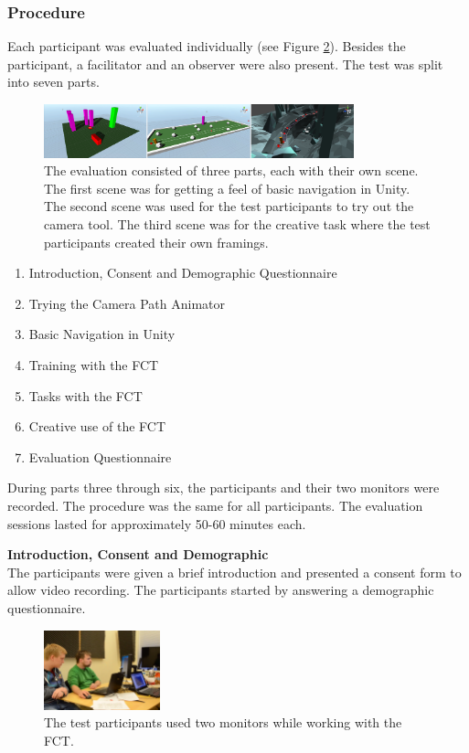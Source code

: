 \subsubsection{Procedure}
Each participant was evaluated individually (see Figure \ref{fig:tt}). Besides the participant, a facilitator and an observer were also present. The test was split into seven parts. 
\begin{figure}[hbtp]
\centering
\includegraphics[width=0.8\textwidth]{Pics/sceneAll_horizontal}
\caption{The evaluation consisted of three parts, each with their own scene. The first scene was for getting a feel of basic navigation in Unity. The second scene was used for the test participants to try out the camera tool. The third scene was for the creative task where the test participants created their own framings.}
\label{fig:sceneAll}
\end{figure}

\begin{enumerate}
\item Introduction, Consent and Demographic Questionnaire
\item Trying the Camera Path Animator
\item Basic Navigation in Unity
\item Training with the FCT
\item Tasks with the FCT
\item Creative use of the FCT
\item Evaluation Questionnaire
\end{enumerate}

During parts three through six, the participants and their two monitors were recorded. The procedure was the same for all participants. The evaluation sessions lasted for approximately 50-60 minutes each. 

\textbf{Introduction, Consent and Demographic}\\
The participants were given a brief introduction and presented a consent form to allow video recording. The participants started by answering a demographic questionnaire. 

\begin{figure}[htbp]
\centering
\includegraphics[width=0.3\textwidth]{Pics/test_setup}
\caption{The test participants used two monitors while working with the FCT.}
\label{fig:tt}
\end{figure}


